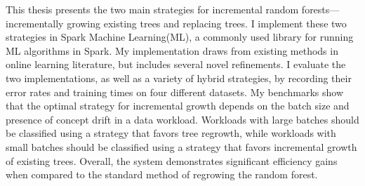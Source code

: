 % 
% 
%

This thesis presents the two main strategies for incremental random
forests---incrementally growing existing trees and replacing trees. I implement
these two strategies in Spark Machine Learning(ML), a commonly used library for
running ML algorithms in Spark.  My implementation draws from existing methods
in online learning literature, but includes several novel refinements. I
evaluate the two implementations, as well as a variety of hybrid strategies, by
recording their error rates and training times on four different datasets. My
benchmarks show that the optimal strategy for incremental growth depends on the
batch size and presence of concept drift in a data workload. Workloads with
large batches should be classified using a strategy that favors tree regrowth,
while workloads with small batches should be classified using a strategy that
favors incremental growth of existing trees.  Overall, the system demonstrates
significant efficiency gains when compared to the standard method of regrowing
the random forest. 

